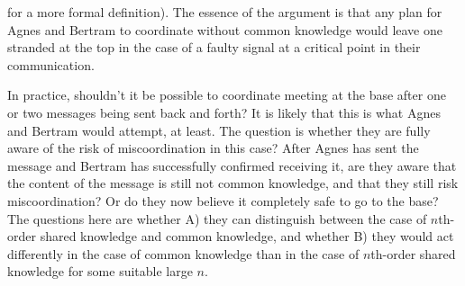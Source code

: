  for a more formal definition). The essence of the argument is that any  
plan for Agnes and Bertram to coordinate without common knowledge would leave one stranded at the top in the case of a faulty signal at a critical point in their communication.

In practice, shouldn't it be possible to coordinate meeting at the base after one or two messages being sent back and forth? It is likely that this is what Agnes and Bertram would attempt, at least. The question is whether they are fully aware of the risk of miscoordination in this case? After Agnes has sent the message and Bertram has successfully confirmed receiving it, are they aware that the content of the message is still not common knowledge, and that they still risk miscoordination? Or do they now believe it completely safe to go to the base? The questions here are whether A) they can distinguish between the case of $n$th-order shared knowledge and common knowledge, and whether B) they would act differently in the case of common knowledge than in the case of $n$th-order shared knowledge for some suitable large $n$. 


